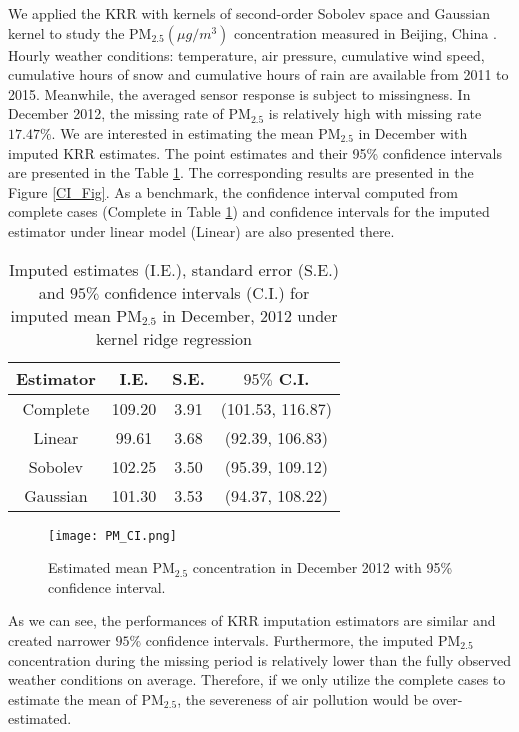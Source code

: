 \documentclass[12pt]{article}
\begin{document}
We applied the KRR with kernels of second-order Sobolev space and Gaussian kernel to study the $\mbox{PM}_{2.5}(\mu g/m^{3})$ concentration measured in Beijing, China \citep{liang2015assessing}. Hourly weather conditions: temperature, air pressure, cumulative wind speed, cumulative hours of snow and cumulative hours of rain are available from 2011 to 2015. Meanwhile, the averaged sensor response is subject to missingness. In December 2012, the missing rate of $\mbox{PM}_{2.5}$ is relatively high with missing rate $17.47\%$. We are interested in estimating the mean $\mbox{PM}_{2.5}$ in December with imputed KRR estimates. The point estimates and their 95\% confidence intervals are presented in the Table \ref{CI_Table}. The corresponding results are presented in the Figure \ref{CI_Fig}.  As a benchmark, the confidence interval computed from complete cases (Complete in Table \ref{CI_Table}) and confidence intervals for the imputed estimator under linear model (Linear) \citep{kim2009unified}  are also presented there. 

\begin{table}[!ht]
\centering
\caption{Imputed estimates (I.E.), standard error (S.E.) and $95\%$ confidence intervals (C.I.) for imputed mean $\mbox{PM}_{2.5}$ in December, 2012 under kernel ridge regression}\label{CI_Table}
\begin{tabular}{cccc}
  \hline
 Estimator & I.E. & S.E. & $95\%$ C.I. \\ 
  \hline
  Complete & 109.20 & 3.91 & (101.53, 116.87) \\ 
  Linear & 99.61 & 3.68 & (92.39, 106.83) \\ 
  Sobolev & 102.25 & 3.50 & (95.39, 109.12) \\ 
  Gaussian & 101.30 & 3.53 & (94.37, 108.22) \\ 
   \hline
\end{tabular}
\end{table}

\begin{figure}[!ht]
    \centering  \label{CI_Fig}
            \caption{Estimated mean $\mbox{PM}_{2.5}$ concentration in December 2012 with 95\% confidence interval.}
    \label{fig:mesh1}
    \texttt{[image: PM\_CI.png]}
\end{figure}

As we can see, the performances of {KRR imputation estimators are similar} and created narrower $95\%$ confidence intervals. Furthermore,  the imputed $\mbox{PM}_{2.5}$ concentration during the missing period 
is relatively lower than  the fully observed weather conditions on average.  Therefore, if we only utilize the complete cases to estimate the  mean of $\mbox{PM}_{2.5}$, the severeness of air pollution would be over-estimated.
\end{document}

